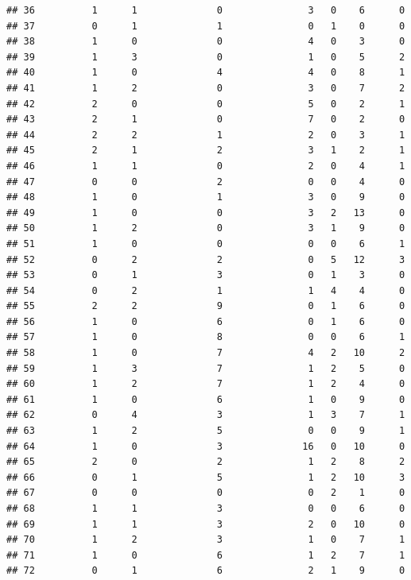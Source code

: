 \documentclass[]{article}
\begin{document}
\begin{verbatim}
## 36          1      1              0               3   0    6      0
## 37          0      1              1               0   1    0      0
## 38          1      0              0               4   0    3      0
## 39          1      3              0               1   0    5      2
## 40          1      0              4               4   0    8      1
## 41          1      2              0               3   0    7      2
## 42          2      0              0               5   0    2      1
## 43          2      1              0               7   0    2      0
## 44          2      2              1               2   0    3      1
## 45          2      1              2               3   1    2      1
## 46          1      1              0               2   0    4      1
## 47          0      0              2               0   0    4      0
## 48          1      0              1               3   0    9      0
## 49          1      0              0               3   2   13      0
## 50          1      2              0               3   1    9      0
## 51          1      0              0               0   0    6      1
## 52          0      2              2               0   5   12      3
## 53          0      1              3               0   1    3      0
## 54          0      2              1               1   4    4      0
## 55          2      2              9               0   1    6      0
## 56          1      0              6               0   1    6      0
## 57          1      0              8               0   0    6      1
## 58          1      0              7               4   2   10      2
## 59          1      3              7               1   2    5      0
## 60          1      2              7               1   2    4      0
## 61          1      0              6               1   0    9      0
## 62          0      4              3               1   3    7      1
## 63          1      2              5               0   0    9      1
## 64          1      0              3              16   0   10      0
## 65          2      0              2               1   2    8      2
## 66          0      1              5               1   2   10      3
## 67          0      0              0               0   2    1      0
## 68          1      1              3               0   0    6      0
## 69          1      1              3               2   0   10      0
## 70          1      2              3               1   0    7      1
## 71          1      0              6               1   2    7      1
## 72          0      1              6               2   1    9      0

\end{verbatim}
\end{document}
